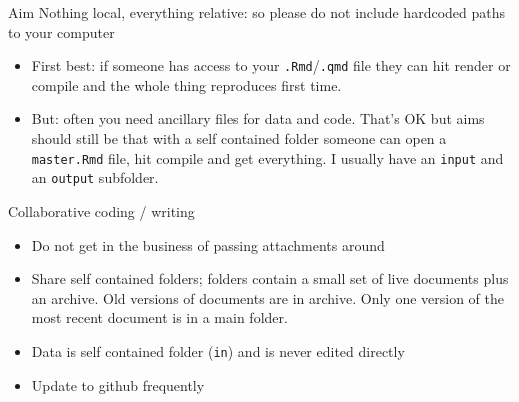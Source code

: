 \documentclass[
  11pt,
  ignorenonframetext,
]{beamer}
\providecommand{\tightlist}{%
  \setlength{\itemsep}{0pt}\setlength{\parskip}{0pt}}\usepackage{longtable,booktabs,array}
\begin{document}
\begin{frame}[fragile]{Aim}
\protect\hypertarget{aim}{}
Nothing local, everything relative: so please do not include hardcoded
paths to your computer

\begin{itemize}
\item
  First best: if someone has access to your \texttt{.Rmd}/\texttt{.qmd}
  file they can hit render or compile and the whole thing reproduces
  first time.
\item
  But: often you need ancillary files for data and code. That's OK but
  aims should still be that with a self contained folder someone can
  open a \texttt{master.Rmd} file, hit compile and get everything. I
  usually have an \texttt{input} and an \texttt{output} subfolder.
\end{itemize}
\end{frame}

\begin{frame}[fragile]{Collaborative coding / writing}
\protect\hypertarget{collaborative-coding-writing}{}
\begin{itemize}
\tightlist
\item
  Do not get in the business of passing attachments around
\item
  Share self contained folders; folders contain a small set of live
  documents plus an archive. Old versions of documents are in archive.
  Only one version of the most recent document is in a main folder.
\item
  Data is self contained folder (\texttt{in}) and is never edited
  directly
\item
  Update to github frequently
\end{itemize}
\end{frame}
\end{document}
